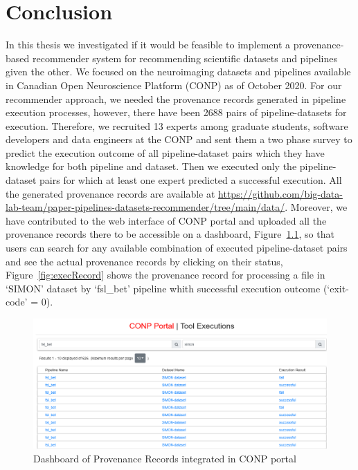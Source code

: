 \chapter{Conclusion}
\label{conclusion}

In this thesis we investigated if it would be feasible to implement a provenance-based recommender system for recommending scientific datasets and pipelines given the other. We focused on the neuroimaging datasets and pipelines available in Canadian Open Neuroscience Platform (CONP) as of October 2020. For our recommender approach, we needed the provenance records generated in pipeline execution processes, however, there have been 2688 pairs of pipeline-datasets for execution. Therefore, we recruited 13 experts among graduate students, software developers and data engineers at the CONP and sent them a two phase survey to predict the execution outcome of all pipeline-dataset pairs which they have knowledge for both pipeline and dataset. Then we executed only the pipeline-dataset pairs for which at least one expert predicted a successful execution. All the generated provenance records are available at \url{https://github.com/big-data-lab-team/paper-pipelines-datasets-recommender/tree/main/data/}. Moreover, we have contributed to the web interface of CONP portal and uploaded all the provenance records there to be accessible on a dashboard, Figure~\ref{fig:dashProvenance}, so that users can search for any available combination of executed pipeline-dataset pairs and see the actual provenance records by clicking on their status, Figure~\ref{fig:execRecord} shows the provenance record for processing a file in `SIMON' dataset by `fsl\_bet' pipeline whith successful execution outcome (`exit-code' = 0).

\begin{figure}
    \centering
    \includegraphics[width=\textwidth,height=\textheight,keepaspectratio]{figures/executiondashboard.png}
    \caption{Dashboard of Provenance Records integrated in CONP portal}
    \label{fig:dashProvenance}
\end{figure}

